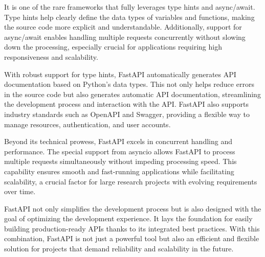 It is one of the rare frameworks that fully leverages type hints and async/await. Type hints help clearly define the data types of variables and functions, making the source code more explicit and understandable. Additionally, support for async/await enables handling multiple requests concurrently without slowing down the processing, especially crucial for applications requiring high responsiveness and scalability.

With robust support for type hints, FastAPI automatically generates API documentation based on Python's data types. This not only helps reduce errors in the source code but also generates automatic API documentation, streamlining the development process and interaction with the API. FastAPI also supports industry standards such as OpenAPI and Swagger, providing a flexible way to manage resources, authentication, and user accounts.

Beyond its technical prowess, FastAPI excels in concurrent handling and performance. The special support from asyncio allows FastAPI to process multiple requests simultaneously without impeding processing speed. This capability ensures smooth and fast-running applications while facilitating scalability, a crucial factor for large research projects with evolving requirements over time.

FastAPI not only simplifies the development process but is also designed with the goal of optimizing the development experience. It lays the foundation for easily building production-ready APIs thanks to its integrated best practices. With this combination, FastAPI is not just a powerful tool but also an efficient and flexible solution for projects that demand reliability and scalability in the future.